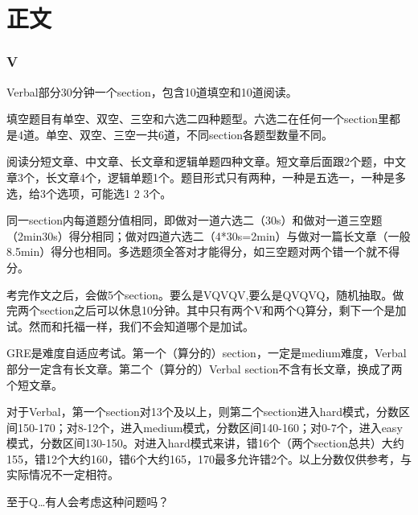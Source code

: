 \documentclass[11pt,a4paper]{article}
\begin{document}
	\newpage
	\part{正文}{
	\section{\bfseries\LARGE{V}}{
		Verbal部分30分钟一个section，包含10道填空和10道阅读。
		\par 填空题目有单空、双空、三空和六选二四种题型。六选二在任何一个section里都是4道。单空、双空、三空一共6道，不同section各题型数量不同。
		\par 阅读分短文章、中文章、长文章和逻辑单题四种文章。短文章后面跟2个题，中文章3个，长文章4个，逻辑单题1个。题目形式只有两种，一种是五选一，一种是多选，给3个选项，可能选1 2 3个。
		\par 同一section内每道题分值相同，即做对一道六选二（30s）和做对一道三空题（2min30s）得分相同；做对四道六选二（4*30s=2min）与做对一篇长文章（一般8.5min）得分也相同。多选题须全答对才能得分，如三空题对两个错一个就不得分。
		
		\vspace{11pt}
		考完作文之后，会做5个section。要么是VQVQV,要么是QVQVQ，随机抽取。做完两个section之后可以休息10分钟。其中只有两个V和两个Q算分，剩下一个是加试。然而和托福一样，我们不会知道哪个是加试。
		\par GRE是难度自适应考试。第一个（算分的）section，一定是medium难度，Verbal部分一定含有长文章。第二个（算分的）Verbal section不含有长文章，换成了两个短文章。
		\par 对于Verbal，第一个section对13个及以上，则第二个section进入hard模式，分数区间150-170；对8-12个，进入medium模式，分数区间140-160；对0-7个，进入easy模式，分数区间130-150。对进入hard模式来讲，错16个（两个section总共）大约155，错12个大约160，错6个大约165，170最多允许错2个。以上分数仅供参考，与实际情况不一定相符。
		\par 至于Q…有人会考虑这种问题吗？
		
		\vspace{11pt}
}}
\end{document}
